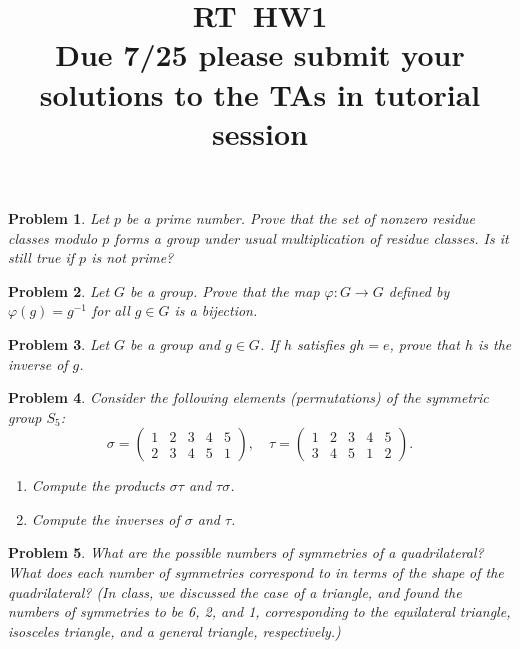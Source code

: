 \documentclass{article}
\title{RT\ HW1 \\ Due 7/25 please submit your solutions to the TAs in tutorial session}
\newtheorem{ex}{Problem}
\begin{document}
\maketitle

\begin{ex}
Let $p$ be a prime number. Prove that the set of nonzero residue classes modulo $p$ forms a group under usual multiplication of residue classes. Is it still true if $p$ is not prime?
\end{ex}

\begin{ex}
  Let $G$ be a group. Prove that the map $\varphi: G \to G$ defined by $\varphi(g) = g^{-1}$ for all $g \in G$ is a bijection.
\end{ex}

\begin{ex}
  Let $G$ be a group and $g \in G$. If $h$ satisfies $gh = e$, prove that $h$ is the inverse of $g$. 
\end{ex}

\begin{ex}
Consider the following elements (permutations) of the symmetric group $S_5$:
\[\sigma = \begin{pmatrix}
1 & 2 & 3 & 4 & 5 \\
2 & 3 & 4 & 5 & 1
\end{pmatrix}, \quad \tau = \begin{pmatrix}
1 & 2 & 3 & 4 & 5 \\ 
3 & 4 & 5 & 1 & 2
\end{pmatrix}.\]
\begin{enumerate}
  \item Compute the products $\sigma \tau$ and $\tau \sigma$.
  \item Compute the inverses of $\sigma$ and $\tau$.
\end{enumerate}

\end{ex}

\begin{ex}
What are the possible numbers of symmetries of a quadrilateral? What does each number of symmetries correspond to in terms of the shape of the quadrilateral? (In class, we discussed the case of a triangle, and found the numbers of symmetries to be 6, 2, and 1, corresponding to the equilateral triangle, isosceles triangle, and a general triangle, respectively.)
\end{ex}
\end{document}
